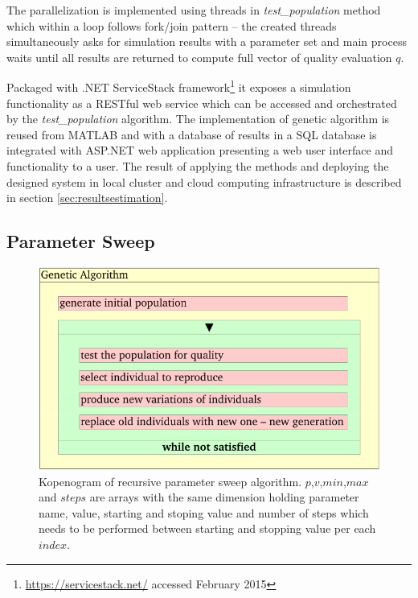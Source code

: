 The parallelization is implemented using threads in \emph{test\_population} method which within a loop follows fork/join pattern -- the created threads simultaneously asks for simulation results with a parameter set and main process waits until all results are returned to compute full vector of quality evaluation $q$.

Packaged with .NET ServiceStack framework\footnote{\url{https://servicestack.net/} accessed February 2015} it exposes a simulation functionality as a RESTful web service which can be accessed and orchestrated by the \emph{test\_population} algorithm. The implementation of genetic algorithm is reused from MATLAB \texttrademark and with a database of results in a SQL database is integrated with ASP.NET web application presenting a web user interface and functionality to a user.
The result of applying the methods and deploying the designed system in local cluster and cloud computing infrastructure is described in section \ref{sec:resultsestimation}.

\subsection{Parameter Sweep}
\label{sec:sensitivity}
\begin{figure}[hbt]
    \centering
     \includegraphics[page=4]{chapter3/GA-kopenogram-crop.pdf}    
    \caption{Kopenogram of recursive parameter sweep algorithm. $p$,$v$,$min$,$max$ and $steps$ are arrays with the same dimension holding parameter name, value, starting and stoping value and number of steps which needs to be performed between starting and stopping value per each $index$.    
    }
    \label{fig:paramsweep}
\end{figure}

